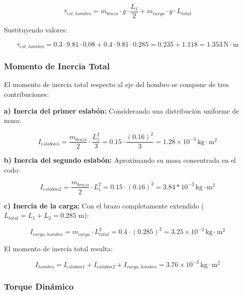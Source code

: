 \begin{equation}
\tau_{est,hombro} = m_{brazo} \cdot g \cdot \frac{L_1}{2} + m_{carga} \cdot g \cdot L_{total}
\end{equation}

Sustituyendo valores:

\begin{equation}
\tau_{est,hombro} = 0.3 \cdot 9.81 \cdot 0.08 + 0.4 \cdot 9.81 \cdot 0.285 = 0.235 + 1.118 = 1.353 \, \text{N} \cdot \text{m}
\end{equation}

\subsubsection{Momento de Inercia Total}

El momento de inercia total respecto al eje del hombro se compone de tres contribuciones:

\textbf{a) Inercia del primer eslabón:} Considerando una distribución uniforme de masa:

\begin{equation}
I_{eslabón1} = \frac{m_{brazo}}{2} \cdot \frac{L_1^2}{3} = 0.15 \cdot \frac{(0.16)^2}{3} = 1.28 \times 10^{-3} \, \text{kg} \cdot \text{m}^2
\end{equation}

\textbf{b) Inercia del segundo eslabón:} Aproximando su masa concentrada en el codo:

\begin{equation}
I_{eslabón2} = \frac{m_{brazo}}{2} \cdot L_1^2 = 0.15 \cdot (0.16)^2 = 3.84 * 10^{-3} \, \text{kg} \cdot \text{m}^2
\end{equation}

\textbf{c) Inercia de la carga:} Con el brazo completamente extendido ($L_{total} = L_1 + L_2 = 0.285$ m):

\begin{equation}
I_{carga,hombro} = m_{carga} \cdot L_{total}^2 = 0.4 \cdot (0.285)^2 = 3.25 \times 10^{-2} \, \text{kg} \cdot \text{m}^2
\end{equation}

El momento de inercia total resulta:

\begin{equation}
I_{hombro} = I_{eslabón1} + I_{eslabón2} + I_{carga,hombro} = 3.76 \times 10^{-2} \, \text{kg} \cdot \text{m}^2
\end{equation}

\subsubsection{Torque Dinámico}


